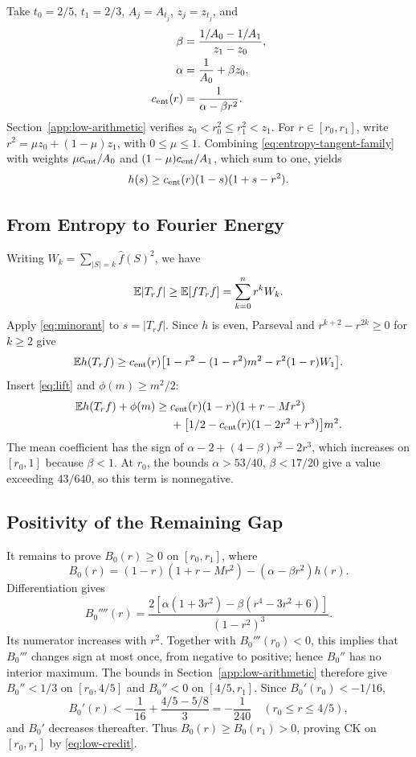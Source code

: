 Take \(t_0=2/5\), \(t_1=2/3\), \(A_j=A_{t_j}\), \(z_j=z_{t_j}\), and
\begin{align*}
 \beta&=\frac{1/A_0-1/A_1}{z_1-z_0},\\
 \alpha&=\frac1{A_0}+\beta z_0,\\
 c_{\rm ent}(r)&=\frac1{\alpha-\beta r^2}.
\end{align*}
Section~\ref{app:low-arithmetic} verifies \(z_0<r_0^2\le r_1^2<z_1\).
For \(r\in[r_0,r_1]\), write
\(r^2=\mu z_0+(1-\mu)z_1\), with \(0\le\mu\le1\).
Combining \eqref{eq:entropy-tangent-family} with weights
\(\mu c_{\rm ent}/A_0\) and \((1-\mu)c_{\rm ent}/A_1\), which sum
to one, yields
\begin{equation}
 h(s)\ge c_{\rm ent}(r)(1-s)(1+s-r^2).
 \label{eq:minorant}
\end{equation}

\subsection{From Entropy to Fourier Energy}

Writing \(W_k=\sum_{|S|=k}\widehat f(S)^2\), we have
\[
 \mathbb E|T_r f|\ge\mathbb E[fT_r f]=\sum_{k=0}^n r^kW_k.
\]
Apply \eqref{eq:minorant} to \(s=|T_r f|\).
Since \(h\) is even, Parseval and
\(r^{k+2}-r^{2k}\ge0\) for \(k\ge2\) give
\[
 \mathbb E h(T_r f)\ge
 c_{\rm ent}(r)\bigl[1-r^2-(1-r^2)m^2-r^2(1-r)W_1\bigr].
\]
Insert \eqref{eq:lift} and \(\phi(m)\ge m^2/2\):
\begin{align}
 \mathbb E h(T_r f)+\phi(m)\ge{}&
 c_{\rm ent}(r)(1-r)(1+r-Mr^2)\notag\\
 &+\bigl[1/2-c_{\rm ent}(r)(1-2r^2+r^3)\bigr]m^2.
 \label{eq:low-credit}
\end{align}
The mean coefficient has the sign of
\(\alpha-2+(4-\beta)r^2-2r^3\), which increases on \([r_0,1]\)
because \(\beta<1\). At \(r_0\), the bounds
\(\alpha>53/40\), \(\beta<17/20\) give a value exceeding
\(43/640\), so this term is nonnegative.

\subsection{Positivity of the Remaining Gap}

It remains to prove \(B_0(r)\ge0\) on \([r_0,r_1]\), where
\[
 B_0(r)=(1-r)(1+r-Mr^2)-(\alpha-\beta r^2)h(r).
\]
Differentiation gives
\begin{equation}
 B_0''''(r)=
 \frac{2[\alpha(1+3r^2)-\beta(r^4-3r^2+6)]}{(1-r^2)^3}.
 \label{eq:low-curvature-shape}
\end{equation}
Its numerator increases with \(r^2\). Together with
\(B_0'''(r_0)<0\), this implies that \(B_0'''\) changes sign at most
once, from negative to positive; hence \(B_0''\) has no interior maximum.
The bounds in Section~\ref{app:low-arithmetic} therefore give
\(B_0''<1/3\) on \([r_0,4/5]\) and \(B_0''<0\) on \([4/5,r_1]\).
Since \(B_0'(r_0)<-1/16\),
\[
 B_0'(r)<-\frac1{16}+\frac{4/5-5/8}{3}=-\frac1{240}
 \quad(r_0\le r\le4/5),
\]
and \(B_0'\) decreases thereafter. Thus
\(B_0(r)\ge B_0(r_1)>0\), proving CK on \([r_0,r_1]\)
by \eqref{eq:low-credit}.


